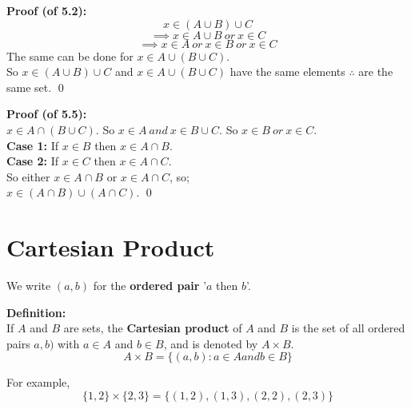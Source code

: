 \documentclass{report}
\newenvironment{frameblue}[1][BlueViolet]
  {\begin{tcolorbox}[colframe=#1,colback=white]}
  {\end{tcolorbox}}
\newenvironment{frameblack}[1][Black]
  {\begin{tcolorbox}[colframe=#1,colback=white]}
  {\end{tcolorbox}}
\begin{document}
\begin{frameblack}
    \textbf{Proof (of 5.2):}
    \begin{equation*}
        x \in (A \cup B) \cup C
    \end{equation*}
    \begin{equation*}
        \implies x \in A \cup B \: or \: x \in C
    \end{equation*}
    \begin{equation*}
        \implies x \in A \: or \: x \in B \: or \: x \in C
    \end{equation*}
    The same can be done for $x \in A \cup (B \cup C)$.\\
    So $ x \in (A \cup B) \cup C$ and $x \in A \cup (B \cup C)$ have the same elements $\therefore$ are the same set.
    \qed
\end{frameblack}

\begin{frameblack}
    \textbf{Proof (of 5.5):}\\
    $x \in  A \cap (B \cup C)$. So $x \in A \: and \: x \in B \cup C$. So $x \in B \: or \: x \in C$.\\
    \textbf{Case 1:} If $x \in B$ then $x \in A \cap B$.\\
    \textbf{Case 2:} If $x \in C$ then $x \in A \cap C$.\\
    So either $x \in A \cap B$ or $x \in A \cap C$, so;\\
    $x \in (A \cap B) \cup (A \cap C)$.
    \qed
\end{frameblack}

\section{Cartesian Product}
 
We write $(a,b)$ for the \textbf{ordered pair} '$a$ then $b$'.
\begin{frameblue}
    \textbf{Definition:}\\
    If $A$ and $B$ are sets, the \textbf{Cartesian product} of $A$ and $B$ is the set of all ordered pairs $a,b)$ with $a \in A$ and $b \in B$, and is denoted by $A \times B$.
    \begin{equation*}
        A \times B = \{ (a,b) : a \in A and b \in B \}
    \end{equation*}
\end{frameblue}

For example,
\begin{equation}
    \{ 1,2\} \times \{ 2,3\} = \{ (1,2),(1,3),(2,2),(2,3) \}
\end{equation}
\end{document}
